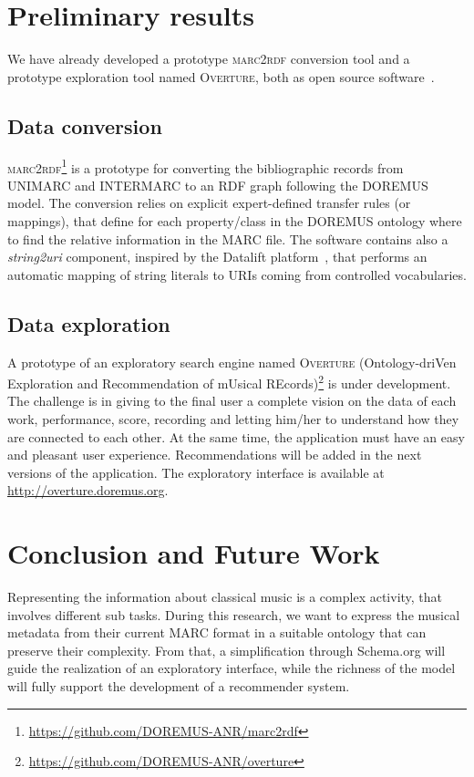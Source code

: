 \documentclass{llncs}
\begin{document}

\section{Preliminary results}
\label{sec:results}
We have already developed a prototype \textsc{marc2rdf} conversion tool and a prototype exploration tool named \textsc{Overture}, both as open source software~\cite{lisena2016exploring}.

\subsection{Data conversion}
\textsc{marc2rdf}\footnote{\url{https://github.com/DOREMUS-ANR/marc2rdf}} is a prototype for converting the bibliographic records from UNIMARC and INTERMARC to an RDF graph following the DOREMUS model. The conversion relies on explicit expert-defined transfer rules (or mappings), that define for each property/class in the DOREMUS ontology where to find the relative information in the MARC file. The software contains also a \textit{string2uri} component, inspired by the Datalift platform~\cite{scharffe2012enabling}, that performs an automatic mapping of string literals to URIs coming from controlled vocabularies.

\subsection{Data exploration}
A prototype of an exploratory search engine named \textsc{Overture} (Ontology-driVen Exploration and Recommendation of mUsical REcords)\footnote{\url{https://github.com/DOREMUS-ANR/overture}} is under development. The challenge is in giving to the final user a complete vision on the data of each work, performance, score, recording and letting him/her to understand how they are connected to each other. At the same time, the application must have an easy and pleasant user experience. Recommendations will be added in the next versions of the application. The exploratory interface is available at \url{http://overture.doremus.org}.


\section{Conclusion and Future Work}
\label{sec:conclusion}
Representing the information about classical music is a complex activity, that involves different sub tasks. During this research, we want to express the musical metadata from their current MARC format in a suitable ontology that can preserve their complexity. From that, a simplification through Schema.org will guide the realization of an exploratory interface, while the richness of the model will fully support the development of a recommender system.
\end{document}
